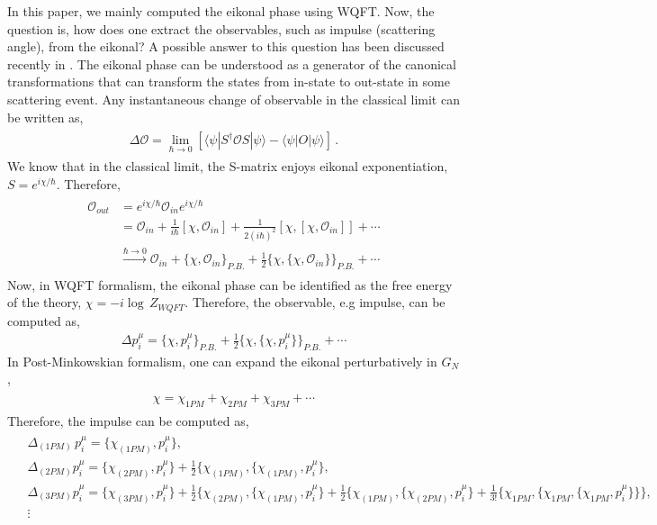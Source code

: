 In this paper, we mainly computed the eikonal phase using WQFT. Now, the question is, how does one extract the observables, such as impulse (scattering angle), from the eikonal? A possible answer to this question has been discussed recently in \cite{Kim:2024grz,Kim:2024svw}. The eikonal phase can be understood as a generator of the canonical transformations that can transform the states from in-state to out-state in some scattering event. Any instantaneous change of observable in the classical limit can be written as,
    \begin{align}
        \begin{split}
            \Delta\mathcal{O}=\lim_{\hbar\to0}\left[\langle\psi|S^\dagger\mathcal{O}S|\psi\rangle-\langle\psi|O|\psi\rangle\right]\,.
        \end{split}
    \end{align}
 We know that in the classical limit, the S-matrix enjoys eikonal exponentiation, $S=e^{i\chi/\hbar}$. Therefore, 
 \begin{align}
     \begin{split}
         \mathcal{O}_{out}&=e^{i\chi/\hbar}\mathcal{O}_{in}e^{i\chi/\hbar}\\ &=\mathcal{O}_{in}+\frac{1}{i\hbar}[\chi,\mathcal{O}_{in}]+\frac{1}{2(i\hbar)^2}[\chi,[\chi,\mathcal{O}_{in}]]+\cdots\\ &
         \xrightarrow[]{\hbar\to 0}\mathcal{O}_{in}+\{\chi,\mathcal{O}_{in}\}_{P.B.}+\frac{1}{2}\{\chi,\{\chi,\mathcal{O}_{in}\}\}_{P.B.}+\cdots
     \end{split}
 \end{align}
 Now, in WQFT formalism, the eikonal phase can be identified as the free energy of the theory, $\chi=-i\log\,Z_{WQFT}$. Therefore, the observable, e.g impulse, can be computed as,
 \begin{align}
     \Delta p_i^\mu=\{\chi,p_i^\mu\}_{P.B.}+\frac{1}{2}\{\chi,\{\chi,p_i^\mu\}\}_{P.B.}+\cdots
 \end{align}
 In Post-Minkowskian formalism, one can expand the eikonal perturbatively in $G_N$,
 \begin{align}
     \begin{split}
         \chi=\chi_{1PM}+\chi_{2PM}+\chi_{3PM}+\cdots
     \end{split}
 \end{align}
 Therefore, the impulse can be computed as,
 \begin{align}
     \begin{split}
         &\Delta_{(1PM)}\,p_i^\mu=\{\chi_{(1PM)},p_i^\mu\},\\ &
         \Delta_{(2PM)}p_i^\mu=\{\chi_{(2PM)},p_i^\mu\}+\frac{1}{2}\{\chi_{(1PM)},\{\chi_{(1PM)},p_i^\mu\},\\ &
         \Delta_{(3PM)}p_i^\mu=\{\chi_{(3PM)},p_i^\mu\}+\frac{1}{2}\{\chi_{(2PM)},\{\chi_{(1PM)},p_i^\mu\}+\frac{1}{2}\{\chi_{(1PM)},\{\chi_{(2PM)},p_i^\mu\}+\frac{1}{3!}\{\chi_{1PM},\{\chi_{1PM},\{\chi_{1PM},p_i^\mu\}\}\},\\ &
         \vdots\label{5.5a}
     \end{split}
 \end{align}
